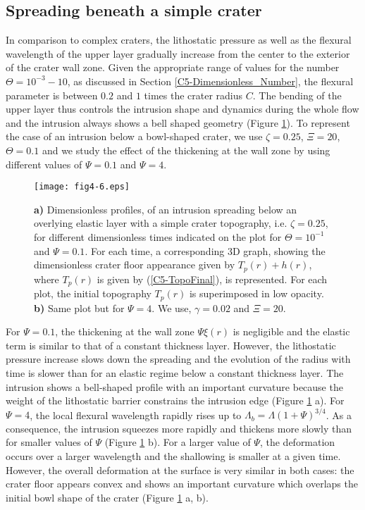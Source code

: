 \subsection{Spreading beneath a simple crater}
\label{C5-SimpleCrater}
		
In comparison to complex craters,  the lithostatic pressure as well as
the flexural wavelength of the upper layer gradually increase from the
center to the exterior of the  crater wall zone. Given the appropriate
range of  values for the  number $\Theta=10^{-3}-10$, as  discussed in
Section  \ref{C5-Dimensionless_Number},  the   flexural  parameter  is
between $0.2$ and $1$ times the  crater radius $C$. The bending of the
upper layer thus controls the  intrusion shape and dynamics during the
whole  flow and  the intrusion  always  shows a  bell shaped  geometry
(Figure \ref{C5-fig4-6}).  To represent the case of an intrusion below
a bowl-shaped crater, we use $\zeta=0.25$, $\Xi=20$, $ \Theta=0.1$ and
we  study the  effect of  the  thickening at  the wall  zone by  using
different values of $\Psi=0.1$ and $\Psi=4$.

\begin{figure}[h!]
  \graphicspath{ {/Users/thorey/Documents/These/Submission/Article/FFC_JGR_2013/Paper_APRES_2nd_REVIEW/} }
  \centering
  \noindent\texttt{[image: fig4-6.eps]}
  \caption{  \textbf{a)}  Dimensionless   profiles,  of  an  intrusion
    spreading below  an overlying elastic  layer with a  simple crater
    topography, i.e.  $\zeta=0.25$,  for different dimensionless times
    indicated  on the  plot for  $\Theta=10^{-1}$ and  $\Psi=0.1$. For
    each  time, a  corresponding 3D  graph, showing  the dimensionless
    crater floor appearance given  by $T_p(r)+h(r)$, where $T_p(r)$ is
    given by (\ref{C5-TopoFinal}), is represented.  For each plot, the
    initial  topography  $T_p(r)$  is  superimposed  in  low  opacity.
    \textbf{b)} Same plot but for $\Psi=4$.  We use, $\gamma=0.02$ and
    $\Xi=20$.}
  \label{C5-fig4-6}
\end{figure}
		
For $\Psi=0.1$,  the thickening  at the  wall zone  $\Psi \xi(r)  $ is
negligible  and the  elastic term  is similar  to that  of a  constant
thickness  layer.  However,  the lithostatic  pressure increase  slows
down the spreading and the evolution of the radius with time is slower
than  for an  elastic regime  below a  constant thickness  layer.  The
intrusion  shows a  bell-shaped  profile with  an important  curvature
because the weight of the lithostatic barrier constrains the intrusion
edge  (Figure \ref{C5-fig4-6}  a).  For  $\Psi=4$, the  local flexural
wavelength rapidly rises up to $\Lambda_{b}=\Lambda(1+\Psi)^{3/4}$. As
a consequence, the  intrusion squeezes more rapidly  and thickens more
slowly  than  for smaller  values  of  $\Psi$ (Figure  \ref{C5-fig4-6}
b). For a larger value of $\Psi$, the deformation occurs over a larger
wavelength and  the shallowing is  smaller at a given  time.  However,
the overall deformation at the surface  is very similar in both cases:
the crater floor appears convex and shows an important curvature which
overlaps the initial bowl shape  of the crater (Figure \ref{C5-fig4-6}
a, b).
	 
